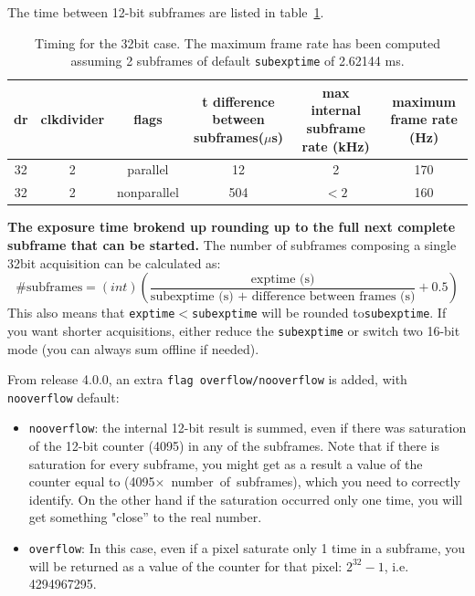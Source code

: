 \documentclass{article}
\begin{document}
The time between 12-bit subframes are listed in table~\ref{t32bitframe}.  
\begin{tiny}
\begin{table}
\begin{flushleft}
\begin{tabular}{|c|c|c|c|c|c|}
\hline
\tiny{dr} & \tiny{clkdivider} & \tiny{flags} & \tiny{t difference between subframes($\mu$s)} & \tiny{max internal subframe rate (kHz)} & \tiny{maximum frame rate (Hz)}\\
\hline
32 & 2 & parallel & 12 & 2 & 170\\
\hline
32 & 2 & nonparallel & 504 & $<2$ & 160\\
\hline
\end{tabular}
\caption{Timing for the 32bit case. The maximum frame rate has been computed assuming 2 subframes of default {\tt{subexptime}} of 2.62144 ms.}
\label{t32bitframe}
\end{flushleft}
\end{table}
\end{tiny}

\textbf{The exposure time brokend up rounding up to the full next complete subframe that can be started.}
The number of subframes composing a single 32bit acquisition can be calculated as:
\begin{equation}
\textrm{\# subframes}= (int) (\frac{\textrm{exptime (s)}}{\textrm{subexptime (s) + difference between frames (s)}}+0.5)
\end{equation}
This also means that {\tt{exptime}}$<${\tt{subexptime}} will be rounded to{\tt{subexptime}}. If you want shorter acquisitions, either reduce the {\tt{subexptime}} or switch two 16-bit mode (you can always sum offline if needed).   

From release 4.0.0, an extra {\tt{flag overflow/nooverflow}} is added, with {\tt{nooverflow}} default:
\begin{itemize}
\item {\tt{nooverflow}}: the internal 12-bit result is summed, even if there was saturation of the 12-bit counter (4095) in any of the subframes. Note that if there is saturation for every subframe, you might get as a result a value of the counter equal to (4095$\times$~number~of~subframes), which you need to correctly identify. On the other hand if the saturation occurred only one time, you will get something "close'' to the real number.
\item {\tt{overflow}}: In this case, even if a pixel saturate only 1 time in a subframe, you will be returned as a value of the counter for that pixel: $2^{32}-1$, i.e. 4294967295.  
\end{itemize}
\end{document}
